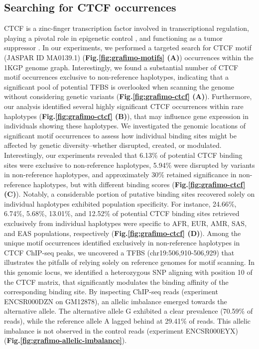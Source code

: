 \documentclass[a4paper, titlepage, openright]{book}
\begin{document}
\subsection{Searching for CTCF occurrences}
CTCF is a zinc-finger transcription factor involved in transcriptional regulation, playing a pivotal role in epigenetic control \citep{ishihara2006ctcf}, and functioning as a tumor suppressor \citep{fiorentino2012tumor}. In our experiments, we performed a targeted search for CTCF motif (JASPAR ID MA0139.1) (\textbf{Fig.\ref{fig:grafimo-motifs} (A)}) occurrences within the 1KGP genome graph. Interestingly, we found a substantial number of CTCF motif occurrences exclusive to non-reference haplotypes, indicating that a significant pool of potential TFBS is overlooked when scanning the genome without considering genetic variants (\textbf{Fig.\ref{fig:grafimo-ctcf} (A)}). Furthermore, our analysis identified several highly significant CTCF occurrences within rare haplotypes (\textbf{Fig.\ref{fig:grafimo-ctcf} (B)}), that may influence gene expression in individuals showing these haplotypes. We investigated the genomic locations of significant motif occurrences to assess how individual binding sites might be affected by genetic diversity--whether disrupted, created, or modulated. Interestingly, our experiments revealed that 6.13\% of potential CTCF binding sites were exclusive to non-reference haplotypes, 5.94\% were disrupted by variants in non-reference haplotypes, and approximately 30\% retained significance in non-reference haplotypes, but with different binding scores (\textbf{Fig.\ref{fig:grafimo-ctcf} (C)}). Notably, a considerable portion of putative binding sites recovered solely on individual haplotypes exhibited population specificity. For instance, 24.66\%, 6.74\%, 5.68\%, 13.01\%, and 12.52\% of potential CTCF binding sites retrieved exclusively from individual haplotypes were specific to AFR, EUR, AMR, SAS, and EAS populations, respectively (\textbf{Fig.\ref{fig:grafimo-ctcf} (D)}). Among the unique motif occurrences identified exclusively in non-reference haplotypes in CTCF ChIP-seq peaks, we uncovered a TFBS (chr19:506,910-506,929) that illustrates the pitfalls of relying solely on reference genomes for motif scanning. In this genomic locus, we identified a heterozygous SNP aligning with position 10 of the CTCF matrix, that significantly modulates the binding affinity of the corresponding binding site. By inspecting ChIP-seq reads (experiment ENCSR000DZN on GM12878), an allelic imbalance emerged towards the alternative allele. The alternative allele G exhibited a clear prevalence (70.59\% of reads), while the reference allele A lagged behind at 29.41\% of reads. This allelic imbalance is not observed in the control reads (experiment ENCSR000EYX) (\textbf{Fig.\ref{fig:grafimo-allelic-imbalance}}).
\end{document}
